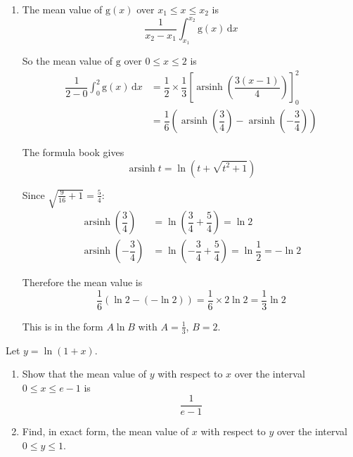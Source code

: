 \documentclass[leqno]{article}
\begin{document}
\begin{enumerate}[
  label=\textbf{\arabic*.},
  leftmargin=*,
  topsep=0pt,
  partopsep=0pt,
  parsep=0pt
]
\begin{djsSolution}
\begin{enumerate}[label=\textbf{(\alph*)}, start=1]
Applying this with \(k=\frac{4}{3}\), and with \(x\) replaced by \(x-1\):
\begin{align*}
\int \dfrac{1}{\sqrt{9x^2-18x+25}}\,\mathrm{d}x&=\dfrac{1}{3}\operatorname{arsinh}\left(\dfrac{x-1}{\frac{4}{3}}\right)+c\\
&=\dfrac{1}{3}\operatorname{arsinh}\left(\dfrac{3(x-1)}{4}\right)+c
\end{align*}

  \item The mean value of \(\mathrm{g}(x)\) over \(x_1\le x\le x_2\) is
\[
\dfrac{1}{x_2-x_1}\int_{x_1}^{x_2} \mathrm{g}(x)\,\mathrm{d}x
\]

So the mean value of \(\mathrm{g}\) over \(0\le x\le 2\) is
\begin{align*}
\dfrac{1}{2-0}\int_0^2 \mathrm{g}(x)\,\mathrm{d}x&=\dfrac{1}{2}\times\dfrac{1}{3}\left[\operatorname{arsinh}\left(\dfrac{3(x-1)}{4}\right)\right]_0^2\\
&=\dfrac{1}{6}\left(\operatorname{arsinh}\left(\dfrac{3}{4}\right)-\operatorname{arsinh}\left(-\dfrac{3}{4}\right)\right)
\end{align*}

The formula book gives
\[
\operatorname{arsinh} t=\ln\left(t+\sqrt{t^2+1}\right)
\]

Since \(\sqrt{\frac{9}{16}+1}=\frac{5}{4}\):
\begin{align*}
\operatorname{arsinh}\left(\dfrac{3}{4}\right)&=\ln\left(\dfrac{3}{4}+\dfrac{5}{4}\right)=\ln 2\\
\operatorname{arsinh}\left(-\dfrac{3}{4}\right)&=\ln\left(-\dfrac{3}{4}+\dfrac{5}{4}\right)=\ln\dfrac{1}{2}=-\ln 2
\end{align*}

Therefore the mean value is
\[
\dfrac{1}{6}\left(\ln 2-(-\ln 2)\right)=\dfrac{1}{6}\times 2\ln 2=\dfrac{1}{3}\ln 2
\]

This is in the form \(A\ln B\) with \(A=\frac{1}{3}\), \(B=2\).
\end{enumerate}
\end{djsSolution}

\newpage

\questionitem

Let $y = \ln(1 + x)$. \\
\begin{enumerate}[label=\textbf{(\alph*)}]
  \item Show that the mean value of $y$ with respect to $x$ over the interval $0 \le x \le e - 1$ is
  \[\dfrac{1}{e - 1}\] 
  \item Find, in exact form, the mean value of $x$ with respect to $y$ over the interval $0 \le y \le 1$.  \\
\end{enumerate}


\end{enumerate}
\end{document}
